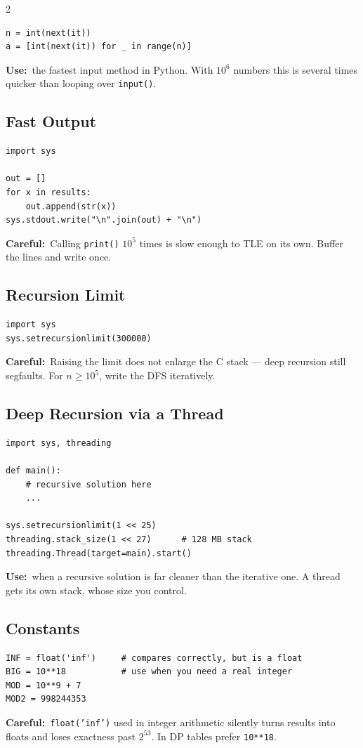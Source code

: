 \documentclass[10pt]{article}
\newcommand{\code}[1]{\texttt{\small #1}}
\newcommand{\uses}[1]{{\color{accent2}\footnotesize\textbf{Use:}}~{\footnotesize #1}\par}
\newcommand{\warn}[1]{{\color{warnc}\footnotesize\textbf{Careful:}}~{\footnotesize #1}\par}
\begin{document}
\begin{multicols}{2}
\begin{lstlisting}
n = int(next(it))
a = [int(next(it)) for _ in range(n)]
\end{lstlisting}
\uses{the fastest input method in Python. With $10^6$ numbers this is
several times quicker than looping over \code{input()}.}

\subsection{Fast Output}
\begin{lstlisting}
import sys

out = []
for x in results:
    out.append(str(x))
sys.stdout.write("\n".join(out) + "\n")
\end{lstlisting}
\warn{Calling \code{print()} $10^5$ times is slow enough to TLE on its
own. Buffer the lines and write once.}

\subsection{Recursion Limit}
\begin{lstlisting}
import sys
sys.setrecursionlimit(300000)
\end{lstlisting}
\warn{Raising the limit does not enlarge the C stack --- deep recursion
still segfaults. For $n \ge 10^5$, write the DFS iteratively.}

\subsection{Deep Recursion via a Thread}
\begin{lstlisting}
import sys, threading

def main():
    # recursive solution here
    ...

sys.setrecursionlimit(1 << 25)
threading.stack_size(1 << 27)      # 128 MB stack
threading.Thread(target=main).start()
\end{lstlisting}
\uses{when a recursive solution is far cleaner than the iterative one.
A thread gets its own stack, whose size you control.}

\subsection{Constants}
\begin{lstlisting}
INF = float('inf')     # compares correctly, but is a float
BIG = 10**18           # use when you need a real integer
MOD = 10**9 + 7
MOD2 = 998244353
\end{lstlisting}
\warn{\code{float('inf')} used in integer arithmetic silently turns
results into floats and loses exactness past $2^{53}$. In DP tables
prefer \code{10**18}.}


\end{multicols}
\end{document}
